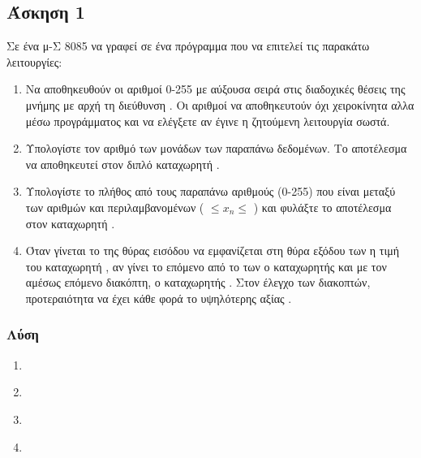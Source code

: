 \newpage \subsection*{Άσκηση 1}

Σε ένα μ-Σ 8085 να γραφεί σε  ένα πρόγραμμα που να επιτελεί τις παρακάτω λειτουργίες:
\begin{enumerate}[wide, label=\textbf{(\alph*)}]
\item
Να αποθηκευθούν οι αριθμοί 0-255 με αύξουσα σειρά στις διαδοχικές θέσεις της μνήμης με αρχή τη
        διεύθυνση . Οι αριθμοί
 να αποθηκευτούν όχι χειροκίνητα αλλα μέσω προγράμματος και να ελέγξετε αν έγινε η ζητούμενη λειτουργία σωστά.

\item
    Υπολογίστε τον αριθμό των μονάδων των παραπάνω δεδομένων. Το αποτέλεσμα να αποθηκευτεί στον διπλό καταχωρητή .

\item
    Υπολογίστε το πλήθος από τους παραπάνω αριθμούς (0-255) που είναι μεταξύ των αριθμών  και 
        περιλαμβανομένων ( $\le x_n \le $ ) και φυλάξτε το αποτέλεσμα στον καταχωρητή .

\item
    Όταν γίνεται  το  της θύρας εισόδου  να εμφανίζεται στη θύρα εξόδου των  η τιμή του καταχωρητή , αν γίνει  το επόμενο από το  των  ο καταχωρητής  και με τον αμέσως επόμενο διακόπτη, ο καταχωρητής . Στον έλεγχο των διακοπτών, προτεραιότητα να έχει κάθε φορά το υψηλότερης αξίας .

\end{enumerate}

\subsubsection*{Λύση}

\begin{enumerate}[label=\textbf{(\alph*)}]


\item
    \inputminted{text}{./ex1/a.8085}
    
\item
    \inputminted{text}{./ex1/b.8085}
        
\item
    \inputminted{text}{./ex1/c.8085}
    
\item
    \inputminted{text}{./ex1/d.8085}

\end{enumerate}

